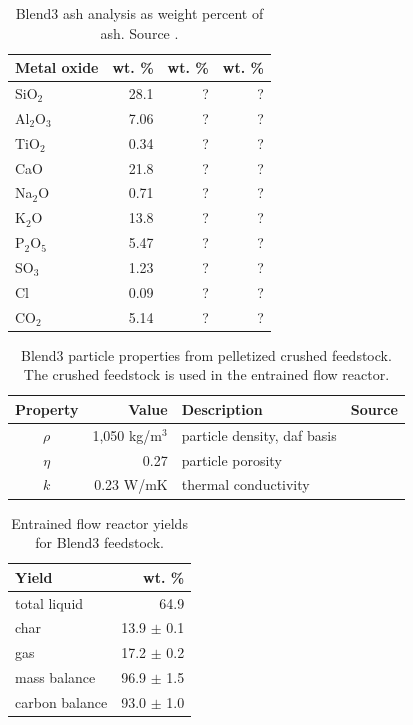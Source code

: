 \begin{table}[H]
    \centering
    \caption{Blend3 ash analysis as weight percent of ash. Source \cite{Choratch-2017}.}
    \begin{tabular}{lrrr}
        \toprule
        Metal oxide & wt. \% & wt. \% & wt. \% \\
        \midrule
        SiO$_2$     & 28.1 & ? & ? \\
        Al$_2$O$_3$ & 7.06 & ? & ? \\
        TiO$_2$     & 0.34 & ? & ? \\
        CaO         & 21.8 & ? & ? \\
        Na$_2$O     & 0.71 & ? & ? \\
        K$_2$O      & 13.8 & ? & ? \\
        P$_2$O$_5$  & 5.47 & ? & ? \\
        SO$_3$      & 1.23 & ? & ? \\
        Cl          & 0.09 & ? & ? \\
        CO$_2$      & 5.14 & ? & ? \\
        \bottomrule
    \end{tabular}
\end{table}

\begin{table}[H]
    \centering
    \caption{Blend3 particle properties from pelletized crushed feedstock. The crushed feedstock is used in the entrained flow reactor.}
    \begin{tabular}{crlc}
        \toprule
        Property & Value & Description & Source \\
        \midrule
        $\rho$  & 1,050 kg/m$^3$ & particle density, daf basis & \cite{Pecha-2018} \\
        $\eta$  & 0.27           & particle porosity & \\
        $k$     & 0.23 W/mK      & thermal conductivity & \\
        \bottomrule
    \end{tabular}
\end{table}

\begin{table}[H]
    \centering
    \caption{Entrained flow reactor yields for Blend3 feedstock.}
    \begin{tabular}{lr}
        \toprule
        Yield & wt. \% \\
        \midrule
        total liquid   & 64.9 \\
        char           & 13.9 $\pm$ 0.1 \\
        gas            & 17.2 $\pm$ 0.2 \\
        mass balance   & 96.9 $\pm$ 1.5 \\
        carbon balance & 93.0 $\pm$ 1.0 \\
        \bottomrule
    \end{tabular}
\end{table}

